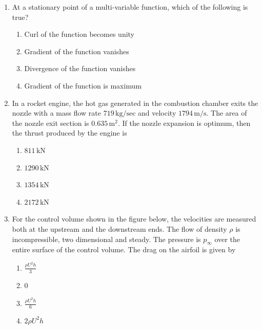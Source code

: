 \documentclass{article}
\begin{document}
\begin{enumerate}
    \item At a stationary point of a multi-variable function, which of the following is true?
    \begin{enumerate}
        \item Curl of the function becomes unity
        \item Gradient of the function vanishes
        \item Divergence of the function vanishes
        \item Gradient of the function is maximum
    \end{enumerate}
        

    \item In a rocket engine, the hot gas generated in the combustion chamber exits the nozzle with a mass flow rate $719 \, \mathrm{kg/sec}$ and velocity $1794 \, \mathrm{m/s}$. The area of the nozzle exit section is $0.635 \, \mathrm{m}^2$. If the nozzle expansion is optimum, then the thrust produced by the engine is
    \begin{multicols}{4}
    \begin{enumerate}
        \item $811 \, \mathrm{kN}$
        \item $1290 \, \mathrm{kN}$
        \item $1354 \, \mathrm{kN}$
        \item $2172 \, \mathrm{kN}$
    \end{enumerate}
    \end{multicols}
    

    \item For the control volume shown in the figure below, the velocities are measured both at the upstream and the downstream ends. The flow of density $\rho$ is incompressible, two dimensional and steady. The pressure is $p_\infty$ over the entire surface of the control volume. The drag on the airfoil is given by
    \begin{figure}[H]
        \centering
        
        \caption{}
        \label{fig:q57}
    \end{figure}
    \begin{enumerate}
        \item $\frac{\rho U^2 h}{3}$
        \item 0
        \item $\frac{\rho U^2 h}{6}$
        \item $2 \rho U^2 h$
    \end{enumerate}


\end{enumerate}
\end{document}
